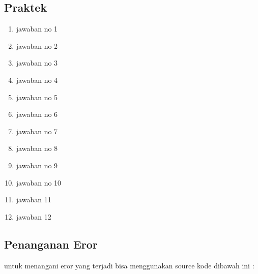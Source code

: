 \subsection{Praktek}
\begin{enumerate}
    \item jawaban no 1
 

    \item jawaban no 2
 

    \item jawaban no 3
 

    \item jawaban no 4
 

    \item jawaban no 5
 

    \item jawaban no 6
 

    \item jawaban no 7
 

    \item jawaban no 8
 

    \item jawaban no 9
 

    \item jawaban no 10
 

    \item jawaban 11
 

    \item jawaban 12
 
\end{enumerate}

\subsection{Penanganan Eror}
untuk menangani eror yang terjadi bisa menggunakan source kode dibawah ini :
 

